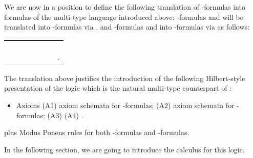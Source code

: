 We are now in a position to define the following translation of \Inql-formulas into formulas of the multi-type language introduced above:
\CPC-formulas  and  will be translated into -formulas via , and \Inql-formulas  and  into -formulas via  as follows:

\begin{center}
\begin{tabular}{r c l c r c l}
 &&  &&  && \\
 &&  &&  && \\
 &&  &&  &&  \\
 &&  &&  && . \\
\end{tabular}
\end{center}


The translation above justifies the introduction of the following Hilbert-style presentation of the logic which is the natural multi-type counterpart of \Inql:
\begin{itemize}
\item Axioms \subitem (A1) \CPC axiom schemata for -formulas;
\subitem (A2) \IPC axiom schemata for -formulas;
\subitem (A3)  \subitem (A4) .
\end{itemize}
plus Modus Ponens rules for both -formulas and -formulas.

In the following section, we are going to introduce the calculus for this logic.
